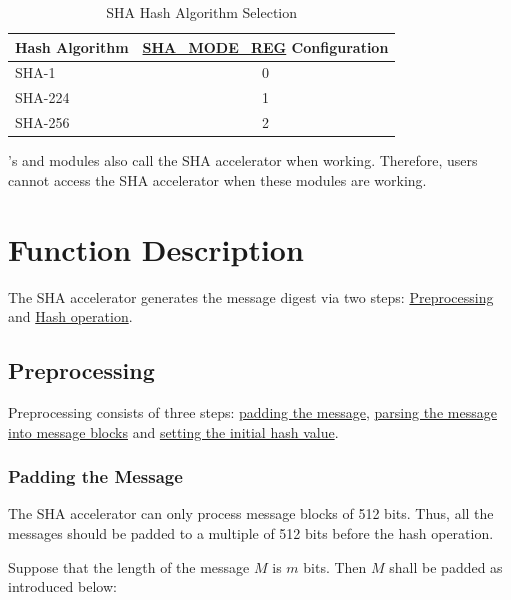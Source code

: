 \documentclass[main\_\_EN.tex]{subfiles}
\begin{document}
\begin{longtable}[c]{| l | c |}
\caption{SHA Hash Algorithm Selection}
\label{tab:sha-mode-summ}
\\\hline
\rowcolor{lightgray}
\textbf{Hash Algorithm} & \textbf{\hyperref[regdesc:SHAMODEREG]{SHA\_MODE\_REG} Configuration}\\
    \hline
    SHA-1 & 0\\
    \hline
    SHA-224 & 1\\
    \hline
    SHA-256 & 2 \\\hline
\end{longtable}


\begin{importantlisting}
\vspace{-0.5em}

    \chipname{}'s  and  modules also call the SHA accelerator when working. Therefore, users cannot access the SHA accelerator when these modules are working.
\end{importantlisting}

\section{Function Description}

The SHA accelerator generates the message digest via two steps: \hyperref[sec:sha-preprocessing]{Preprocessing} and  \hyperref[sec:sha-hash-operation]{Hash operation}.

\subsection{Preprocessing}\label{sec:sha-preprocessing}

Preprocessing consists of three steps: \hyperref[sec:sha-text-padding]{padding the message}, \hyperref[sec:sha-parsing-message]{parsing the message into message blocks} and \hyperref[sec:sha-initial-hash]{setting the initial hash value}.

\subsubsection{Padding the Message}\label{sec:sha-text-padding}

The SHA accelerator can only process message blocks of 512 bits. Thus, all the messages should be padded to a multiple of 512 bits before the hash operation.

Suppose that the length of the message \begin{math}M\end{math} is \begin{math} m \end{math} bits. Then \begin{math} M \end{math} shall be padded as introduced below:
\end{document}
